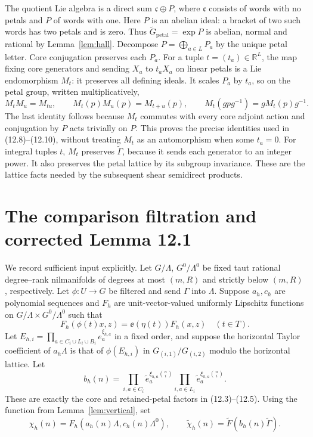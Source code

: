 \documentclass[11pt]{article}
\newcommand{\R}{\mathbb R}\newcommand{\Q}{\mathbb Q}
\begin{document}
The quotient Lie algebra is a direct sum $\mathfrak c\oplus P$, where
$\mathfrak c$ consists of words with no petals and $P$ of words with one.
Here $P$ is an abelian ideal: a bracket of two such words has two petals
and is zero. Thus $\widetilde G_{\mathrm{petal}}=\exp P$ is abelian, normal
and rational by Lemma~\ref{lem:hall}. Decompose $P=\bigoplus_{a\in L}P_a$
by the unique petal letter. Core conjugation preserves each $P_a$.
For a tuple $t=(t_a)\in\R^L$, the map fixing core generators and sending
$X_a$ to $t_aX_a$ on linear petals is a Lie endomorphism $M_t$:
it preserves all defining ideals. It scales $P_a$ by $t_a$, so on the petal
group, written multiplicatively,
\[
 M_tM_u=M_{tu},\qquad M_t(p)M_u(p)=M_{t+u}(p),\qquad
 M_t(gpg^{-1})=gM_t(p)g^{-1}.
\]
The last identity follows because $M_t$ commutes with every core adjoint
action and conjugation by $P$ acts trivially on $P$. This proves the precise
identities used in (12.8)--(12.10), without treating $M_t$ as an automorphism
when some $t_a=0$. For integral tuples $t$, $M_t$ preserves
$\widetilde\Gamma$, because it sends each generator to an integer power.
It also preserves the petal lattice by its subgroup invariance. These are
the lattice facts needed by the subsequent shear semidirect products.

\section{The comparison filtration and corrected Lemma 12.1}
We record sufficient input explicitly. Let $G/\Lambda$, $G^0/\Lambda^0$
be fixed taut rational degree--rank nilmanifolds of degrees at most $(m,R)$
and strictly below $(m,R)$, respectively. Let $\phi:U\to G$ be filtered
and send $\Gamma$ into $\Lambda$. Suppose $a_h,c_h$ are polynomial sequences
and $F_h$ are unit-vector-valued uniformly Lipschitz functions on
$G/\Lambda\times G^0/\Lambda^0$ such that
\begin{equation}\label{eq:Fchar}
 F_h(\phi(t)x,z)=\ee(\eta(t))F_h(x,z)\quad(t\in T).
\end{equation}
Let $E_{h,i}=\prod_{a\in C_i\cup L_i\cup B_i}e_a^{\xi_{h,a}}$ in a fixed
order, and suppose the horizontal Taylor coefficient of $a_h\Lambda$ is
that of $\phi(E_{h,i})$ in $G_{(i,1)}/G_{(i,2)}$ modulo the horizontal
lattice. Let
\[
 b_h(n)=\prod_{i,a\in C_i}\widetilde e_a^{\xi_{h,a}\binom ni}
           \prod_{i,a\in L_i}\widetilde e_a^{\xi_{h,a}\binom ni}.
\]
These are exactly the core and retained-petal factors in (12.3)--(12.5).
Using the function from Lemma~\ref{lem:vertical}, set
\[
 \chi_h(n)=F_h(a_h(n)\Lambda,c_h(n)\Lambda^0),\qquad
 \widetilde\chi_h(n)=\widetilde F(b_h(n)\widetilde\Gamma).
\]
\end{document}
